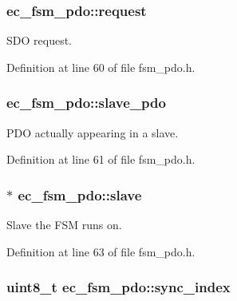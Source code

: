 \subsubsection[{request}]{ ec\-\_\-fsm\-\_\-pdo\-::request}\label{structec__fsm__pdo_a437105cab7019aad6aed6d5cf6326e4a}


S\-D\-O request. 



Definition at line 60 of file fsm\-\_\-pdo.\-h.

\subsubsection[{slave\-\_\-pdo}]{ ec\-\_\-fsm\-\_\-pdo\-::slave\-\_\-pdo}\label{structec__fsm__pdo_a83ce3aec31b10b4941c60088ac1c4a10}


P\-D\-O actually appearing in a slave. 



Definition at line 61 of file fsm\-\_\-pdo.\-h.

\subsubsection[{slave}]{$\ast$ ec\-\_\-fsm\-\_\-pdo\-::slave}\label{structec__fsm__pdo_a659ca1e17ea96e9be327dd65eea054e4}


Slave the F\-S\-M runs on. 



Definition at line 63 of file fsm\-\_\-pdo.\-h.

\subsubsection[{sync\-\_\-index}]{\setlength{\rightskip}{0pt plus 5cm}uint8\-\_\-t ec\-\_\-fsm\-\_\-pdo\-::sync\-\_\-index}\label{structec__fsm__pdo_a8b69e76c8f517ca1d7e8d782122ce7b8}


